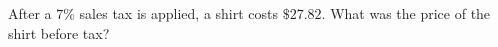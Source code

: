 After a $7\%$ sales tax is applied, a shirt costs $\$27.82$. What was the price of the shirt before tax?
